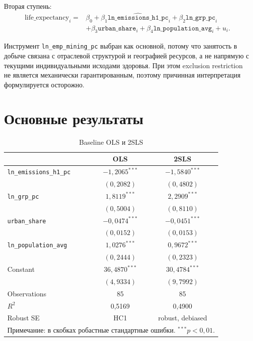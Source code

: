 \documentclass[10pt,a4paper]{article}
\begin{document}
Вторая ступень:
\begin{equation}
\label{eq:second}
\begin{aligned}
\text{life\_expectancy}_i ={}& \beta_0+\beta_1\widehat{\texttt{ln\_emissions\_h1\_pc}}_i+\beta_2\texttt{ln\_grp\_pc}_i\\
&+\beta_3\texttt{urban\_share}_i+\beta_4\texttt{ln\_population\_avg}_i+u_i .
\end{aligned}
\end{equation}

Инструмент \texttt{ln\_emp\_mining\_pc} выбран как основной, потому что занятость в добыче связана с отраслевой структурой и географией ресурсов, а не напрямую с текущими индивидуальными исходами здоровья. При этом exclusion restriction не является механически гарантированным, поэтому причинная интерпретация формулируется осторожно.

\section{Основные результаты}

\begin{table}[H]
\centering
\caption{Baseline OLS и 2SLS}
\label{tab:main}
\begin{tabular}{lcc}
\toprule
 & \textbf{OLS} & \textbf{2SLS} \\
\midrule
\texttt{ln\_emissions\_h1\_pc} & $-1{,}2065^{***}$ & $-1{,}5840^{***}$ \\
 & $(0{,}2082)$ & $(0{,}4802)$ \\
\texttt{ln\_grp\_pc} & $1{,}8119^{***}$ & $2{,}2909^{***}$ \\
 & $(0{,}5004)$ & $(0{,}8110)$ \\
\texttt{urban\_share} & $-0{,}0474^{***}$ & $-0{,}0451^{***}$ \\
 & $(0{,}0152)$ & $(0{,}0153)$ \\
\texttt{ln\_population\_avg} & $1{,}0276^{***}$ & $0{,}9672^{***}$ \\
 & $(0{,}2444)$ & $(0{,}2323)$ \\
Constant & $36{,}4870^{***}$ & $30{,}4784^{***}$ \\
 & $(4{,}9334)$ & $(9{,}7992)$ \\
\midrule
Observations & 85 & 85 \\
$R^2$ & 0{,}5169 & 0{,}4900 \\
Robust SE & HC1 & robust, debiased \\
\bottomrule
\multicolumn{3}{l}{\footnotesize Примечание: в скобках робастные стандартные ошибки. $^{***}p<0{,}01$.}
\end{tabular}
\end{table}
\end{document}
